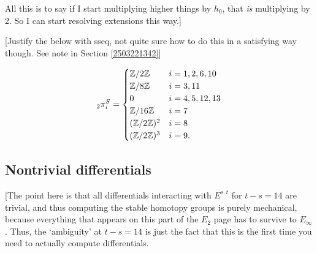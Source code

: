 \documentclass{MetricNotes2023}
\def\bb{\ensuremath\mathbb}
\def\inte{\ensuremath\mathbb{Z}}
\DeclareMathOperator{\Ext}{Ext}
\begin{document}
All this is to say if I start multiplying higher things by \(h_0\), that \textit{is} multiplying by 2. So I can start resolving extensions this way.]



[Justify the below with sseq, not quite sure how to do this in a satisfying way though. See note in Section \ref{2503221342}]

\begin{theorem}
\begin{align*}
\text{}_{2}\pi_i^S = \begin{cases}
\inte/2\inte & i = 1, 2, 6,10\\
\inte/8\inte & i = 3, 11\\
0 & i = 4, 5, 12, 13\\
\inte/16\inte & i = 7\\
(\inte/2\inte)^2 & i = 8\\
(\inte/2\inte)^3 & i=9.
\end{cases}
\end{align*}
\end{theorem}

\subsection{Nontrivial differentials}

[The point here is that all differentials interacting with \(E^{s,t}\) for \(t-s=14\) are trivial, and thus computing the stable homotopy groups is purely mechanical, because everything that appears on this part of the \(E_2\) page has to survive to \(E_\infty\). Thus, the `ambiguity' at \(t-s=14\) is just the fact that this is the first time you need to actually compute differentials.
\end{document}
